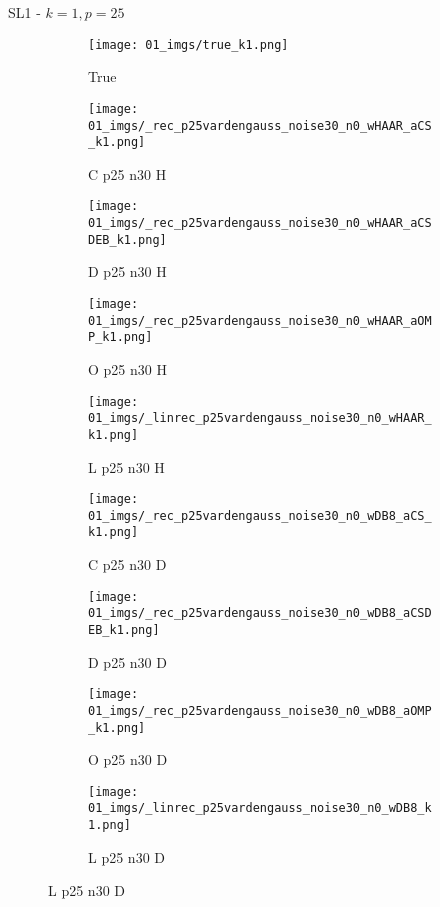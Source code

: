 \begin{frame}{SL1 - $k=1,p=25$}{}
\begin{figure}
\begin{subfigure}{0.1\textwidth}
\texttt{[image: 01\_imgs/true\_k1.png]}
\caption*{\Tiny True}
\end{subfigure}
\begin{subfigure}{0.1\textwidth}
\texttt{[image: 01\_imgs/\_rec\_p25vardengauss\_noise30\_n0\_wHAAR\_aCS\_k1.png]}
\caption*{\Tiny C p25 n30 H}
\end{subfigure}
\begin{subfigure}{0.1\textwidth}
\texttt{[image: 01\_imgs/\_rec\_p25vardengauss\_noise30\_n0\_wHAAR\_aCSDEB\_k1.png]}
\caption*{\Tiny D p25 n30 H}
\end{subfigure}
\begin{subfigure}{0.1\textwidth}
\texttt{[image: 01\_imgs/\_rec\_p25vardengauss\_noise30\_n0\_wHAAR\_aOMP\_k1.png]}
\caption*{\Tiny O p25 n30 H}
\end{subfigure}
\begin{subfigure}{0.1\textwidth}
\texttt{[image: 01\_imgs/\_linrec\_p25vardengauss\_noise30\_n0\_wHAAR\_k1.png]}
\caption*{\Tiny L p25 n30 H}
\end{subfigure}
\begin{subfigure}{0.1\textwidth}
\texttt{[image: 01\_imgs/\_rec\_p25vardengauss\_noise30\_n0\_wDB8\_aCS\_k1.png]}
\caption*{\Tiny C p25 n30 D}
\end{subfigure}
\begin{subfigure}{0.1\textwidth}
\texttt{[image: 01\_imgs/\_rec\_p25vardengauss\_noise30\_n0\_wDB8\_aCSDEB\_k1.png]}
\caption*{\Tiny D p25 n30 D}
\end{subfigure}
\begin{subfigure}{0.1\textwidth}
\texttt{[image: 01\_imgs/\_rec\_p25vardengauss\_noise30\_n0\_wDB8\_aOMP\_k1.png]}
\caption*{\Tiny O p25 n30 D}
\end{subfigure}
\begin{subfigure}{0.1\textwidth}
\texttt{[image: 01\_imgs/\_linrec\_p25vardengauss\_noise30\_n0\_wDB8\_k1.png]}
\caption*{\Tiny L p25 n30 D}
\end{subfigure}
\end{figure}
\end{frame}

